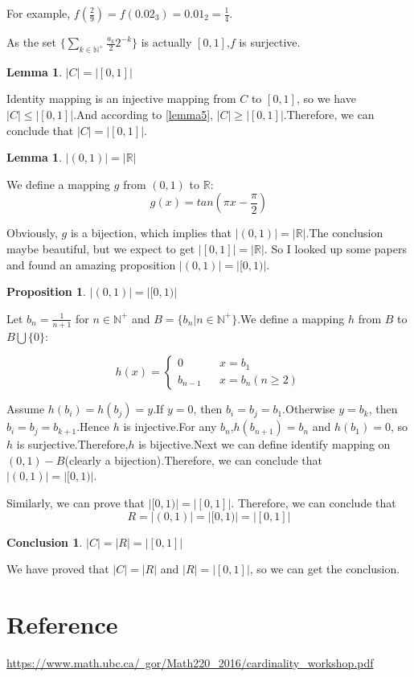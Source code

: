\documentclass{article}
\newtheorem{lemma}[theorem]{Lemma}
\newtheorem{proposition}[theorem]{Proposition}
\newtheorem{conclusion}[theorem]{Conclusion}
\begin{document}
For example, $f(\frac{2}{9})=f(0.02_3)=0.01_2=\frac{1}{4}$.

As the set $\{ \sum_{k\in\mathbb{N}^{+}}\frac{a_k}{2}2^{-k} \}$ is actually $[0,1]$,$f$ is surjective.

\begin{lemma}\label{lemma6}
\textbf{$|C|=|[0,1]|$}
\end{lemma}
Identity mapping is an injective mapping from $C$ to $[0,1]$, so we have $|C|\leq|[0,1]|$.And according to \cref{lemma5}, $|C|\geq|[0,1]|$.Therefore, we can conclude that $|C|=|[0,1]|$.

\begin{lemma}\label{lemma7}
\textbf{$|(0,1)|=|\mathbb{R}|$}
\end{lemma}
We define a mapping $g$ from $(0,1)$ to $\mathbb{R}$:
$$g(x)=tan(\pi x - \frac{\pi}{2})$$

Obviously, $g$ is a bijection, which implies that $|(0,1)|=|\mathbb{R}|$.The conclusion maybe beautiful, but we expect to get $|[0,1]|=|\mathbb{R}|$. So I looked up some papers and found an amazing proposition $|(0,1)| = |[0,1)|$.

\begin{proposition}\label{pro9}
$|(0,1)| = |[0,1)|$
\end{proposition}

Let $b_n=\frac{1}{n+1}$ for $n\in\mathbb{N}^{+}$ and $B=\{b_n|n\in\mathbb{N}^{+}\}$.We define a mapping $h$ from $B$ to $B\bigcup\{0\}$:

\begin{equation}
h(x)=\left\{
\begin{array}{rcl}
0 & & x=b_1\\
b_{n-1} & & x=b_n(n\geq2)
\end{array} \right.
\end{equation}

Assume $h(b_i)=h(b_j)=y$.If $y=0$, then $b_i=b_j=b_1$.Otherwise $y=b_k$, then $b_i=b_j=b_{k+1}$.Hence $h$ is injective.For any $b_n$,$h(b_{n+1})=b_n$ and $h(b_1)=0$, so $h$ is surjective.Therefore,$h$ is bijective.Next we can define identify mapping on $(0,1)-B$(clearly a bijection).Therefore, we can conclude that $|(0,1)|=|[0,1)|$.

Similarly, we can prove that $|[0,1)|=|[0,1]|$. Therefore, we can conclude that
$$R=|(0,1)| = |[0,1)|=|[0,1]|$$

\begin{conclusion}
$|C|=|R|=|[0,1]|$
\end{conclusion}
We have proved that $|C|=|R|$ and $|R|=|[0,1]|$, so we can get the conclusion.

\section*{Reference}
\href{
https://www.math.ubc.ca/~gor/Math220_2016/cardinality_workshop.pdf}{https://www.math.ubc.ca/~gor/Math220\_2016/cardinality\_workshop.pdf}
\end{document}
